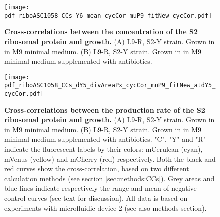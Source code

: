 \begin{figure}
    \centering
    \texttt{[image: pdf\_riboASC1058\_CCs\_Y6\_mean\_cycCor\_muP9\_fitNew\_cycCor.pdf]}
    \caption{ 
        \textbf{Cross-correlations between the concentration of the S2 ribosomal protein and growth.}
        (A) L9-R, S2-Y strain. Grown in in M9 minimal medium.
        (B) L9-R, S2-Y strain. Grown in in M9 minimal medium supplemented with antibiotics. 
    }
    \label{fig:ribo:CCsEmuS2}
\end{figure}

\begin{figure}
    \centering
    \texttt{[image: pdf\_riboASC1058\_CCs\_dY5\_divAreaPx\_cycCor\_muP9\_fitNew\_atdY5\_cycCor.pdf]}
    \caption{ 
        \textbf{Cross-correlations between the production rate of the S2 ribosomal protein and growth.}
        (A) L9-R, S2-Y strain. Grown in in M9 minimal medium.
        (B) L9-R, S2-Y strain. Grown in in M9 minimal medium supplemented with antibiotics. 
        "C", "Y" and "R" indicate the fluorescent labels by their colors: mCerulean (cyan), mVenus (yellow) and mCherry (red) respectively.
        Both the black and red curves show the cross-correlation, based on two different calculation methods (see section \ref{sec:methods:CCs}).
        Grey areas and blue lines indicate respectively the range and mean of negative control curves (see text for discussion).
        All data is based on experiments with microfluidic device 2 (see also methods section).
%
    }
    \label{fig:ribo:CCsPmuS2}
\end{figure}




